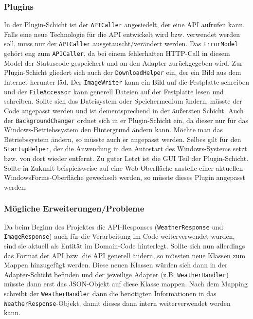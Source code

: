 \subsubsection{Plugins}
In der Plugin-Schicht ist der \texttt{APICaller} angesiedelt, der eine API aufrufen kann. Falls eine neue Technologie für die API entwickelt wird bzw. verwendet werden soll, muss nur der \texttt{APICaller} ausgetauscht/verändert werden. Das \texttt{ErrorModel} gehört eng zum \texttt{APICaller}, da bei einem fehlerhaften HTTP-Call in diesem Model der Statuscode gespeichert und an den Adapter zurückgegeben wird. Zur Plugin-Schicht gliedert sich auch der \texttt{DownloadHelper} ein, der ein Bild aus dem Internet herunter läd. Der \texttt{ImageWriter} kann ein Bild auf die Festplatte schreiben und der \texttt{FileAccessor} kann generell Dateien auf der Festplatte lesen und schreiben. Sollte sich das Dateisystem oder Speichermedium ändern, müsste der Code angepasst werden und ist dementsprechend in der äußersten Schicht. Auch der \texttt{BackgroundChanger} ordnet sich in er Plugin-Schicht ein, da dieser nur für das Windows-Betriebssystem den Hintergrund ändern kann. Möchte man das Betriebssystem ändern, so müsste auch er angepasst werden. Selbes gilt für den \texttt{StartupHelper}, der die Anwendung in den Autostart des Windows-Systems setzt bzw. von dort wieder entfernt. Zu guter Letzt ist die GUI Teil der Plugin-Schicht. Sollte in Zukunft beispielsweise auf eine Web-Oberfläche anstelle einer aktuellen WindowsForms-Oberfläche gewechselt werden, so müsste dieses Plugin angepasst werden.
\subsubsection{Mögliche Erweiterungen/Probleme}
Da beim Beginn des Projektes die API-Responses (\texttt{WeatherResponse} und \texttt{ImageResponse}) auch für die Verarbeitung im Code weiterverwendet wurden, sind sie aktuell als Entität im Domain-Code hinterlegt. Sollte sich nun allerdings das Format der API bzw. die API generell ändern, so müssten neue Klassen zum Mappen hinzugefügt werden. Diese neuen Klassen würden sich dann in der Adapter-Schicht befinden und der jeweilige Adapter (z.B. \texttt{WeatherHandler}) müsste dann erst das JSON-Objekt auf diese Klasse mappen. Nach dem Mapping schreibt der \texttt{WeatherHandler} dann die benötigten Informationen in das \texttt{WeatherResponse}-Objekt, damit dieses dann intern weiterverwendet werden kann.